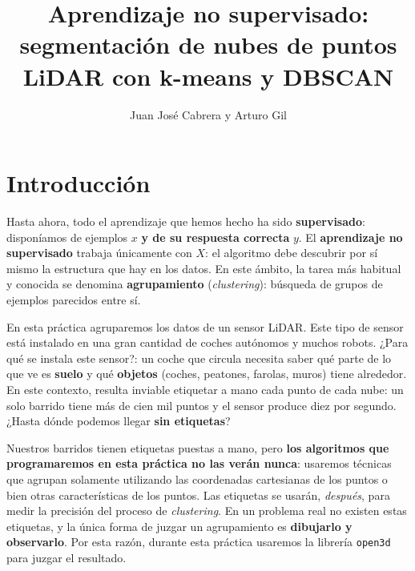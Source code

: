 \documentclass{article}
\title{Aprendizaje no supervisado:\\ segmentación de nubes de puntos LiDAR con k-means y DBSCAN}
\author{Juan José Cabrera y Arturo Gil}
\begin{document}
\maketitle

\section{Introducción}
Hasta ahora, todo el aprendizaje que hemos hecho ha sido \textbf{supervisado}: disponíamos de ejemplos $x$ \textbf{y de su respuesta correcta} $y$. El \textbf{aprendizaje no supervisado} trabaja únicamente con $X$: el algoritmo debe descubrir por sí mismo la estructura que hay en los datos. En este ámbito, la tarea más habitual y conocida se denomina \textbf{agrupamiento} (\textit{clustering}): búsqueda de grupos de ejemplos parecidos entre sí.

En esta práctica agruparemos los datos de un sensor LiDAR. Este tipo de sensor está instalado en una gran cantidad de coches autónomos y muchos robots. ¿Para qué se instala este sensor?: un coche que circula necesita saber qué parte de lo que ve es \textbf{suelo} y qué \textbf{objetos} (coches, peatones, farolas, muros) tiene alrededor. En este contexto, resulta inviable etiquetar a mano cada punto de cada nube: un solo barrido tiene más de cien mil puntos y el sensor produce diez por segundo. ¿Hasta dónde podemos llegar \textbf{sin etiquetas}?

\begin{tcolorbox}[colback=yellow!8!white, colframe=orange!70!black, title=\textbf{Las etiquetas sólo sirven para medir}]
Nuestros barridos tienen etiquetas puestas a mano, pero \textbf{los algoritmos que programaremos en esta práctica no las verán nunca}: usaremos técnicas que agrupan solamente utilizando las coordenadas cartesianas de los puntos o bien otras características de los puntos. Las etiquetas se usarán, \emph{después}, para medir la precisión del proceso de \textit{clustering}. En un problema real no existen estas etiquetas, y la única forma de juzgar un agrupamiento es \textbf{dibujarlo y observarlo}. Por esta razón, durante esta práctica usaremos la librería \texttt{open3d} para juzgar el resultado.
\end{tcolorbox}
\end{document}

